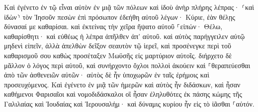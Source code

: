 \documentclass{openreader}
\begin{document}
Καὶ ἐγένετο ἐν τῷ εἶναι αὐτὸν ἐν μιᾷ τῶν πόλεων καὶ ἰδοὺ ἀνὴρ πλήρης λέπρας· ⸂καὶ ἰδὼν⸃ τὸν Ἰησοῦν πεσὼν ἐπὶ πρόσωπον ἐδεήθη αὐτοῦ λέγων· Κύριε, ἐὰν θέλῃς δύνασαί με καθαρίσαι. 
καὶ ἐκτείνας τὴν χεῖρα ἥψατο αὐτοῦ ⸀εἰπών· Θέλω, καθαρίσθητι· καὶ εὐθέως ἡ λέπρα ἀπῆλθεν ἀπ’ αὐτοῦ. 
καὶ αὐτὸς παρήγγειλεν αὐτῷ μηδενὶ εἰπεῖν, ἀλλὰ ἀπελθὼν δεῖξον σεαυτὸν τῷ ἱερεῖ, καὶ προσένεγκε περὶ τοῦ καθαρισμοῦ σου καθὼς προσέταξεν Μωϋσῆς εἰς μαρτύριον αὐτοῖς. 
διήρχετο δὲ μᾶλλον ὁ λόγος περὶ αὐτοῦ, καὶ συνήρχοντο ὄχλοι πολλοὶ ἀκούειν καὶ ⸀θεραπεύεσθαι ἀπὸ τῶν ἀσθενειῶν αὐτῶν· 
αὐτὸς δὲ ἦν ὑποχωρῶν ἐν ταῖς ἐρήμοις καὶ προσευχόμενος. 
Καὶ ἐγένετο ἐν μιᾷ τῶν ἡμερῶν καὶ αὐτὸς ἦν διδάσκων, καὶ ἦσαν καθήμενοι Φαρισαῖοι καὶ νομοδιδάσκαλοι οἳ ἦσαν ἐληλυθότες ἐκ πάσης κώμης τῆς Γαλιλαίας καὶ Ἰουδαίας καὶ Ἰερουσαλήμ· καὶ δύναμις κυρίου ἦν εἰς τὸ ἰᾶσθαι ⸀αὐτόν. 
\end{document}
